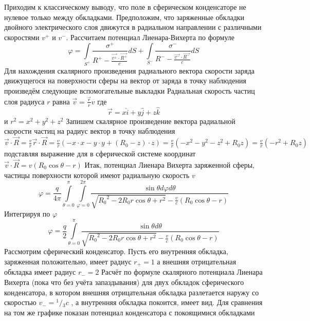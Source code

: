﻿\documentclass{article}
\begin{document}
Приходим к классическому выводу, что поле в сферическом конденсаторе не нулевое только между обкладками.
Предположим, что заряженные обкладки двойного электрического слоя движутся в радиальном направлении с различными скоростями ${{v}^{+}}$ и ${{v}^{-}}$. 
Рассчитаем потенциал Лиенара-Вихерта по формуле
	\[\varphi =\int\limits_{{{S}^{+}}}{\frac{{{\sigma }^{+}}}{{{R}^{+}}-\frac{\overrightarrow{{{v}^{+}}}\cdot \overrightarrow{{{R}^{+}}}}{c}}dS+}\int\limits_{{{S}^{-}}}{\frac{{{\sigma }^{-}}}{{{R}^{-}}-\frac{\overrightarrow{{{v}^{-}}}\cdot \overrightarrow{{{R}^{-}}}}{c}}dS}\] 	
Для нахождения скалярного произведения радиального вектора скорости заряда движущегося на поверхности сферы на вектор от заряда в точку наблюдения произведём следующие вспомогательные выкладки
Радиальная скорость частиц слоя радиуса $r$ равна $\overrightarrow{v}=\frac{\overrightarrow{r}}{r}v$ где \[\overrightarrow{r}=x\widehat{i}+y\widehat{j}+z\widehat{k}\] и ${{r}^{2}}={{x}^{2}}+{{y}^{2}}+{{z}^{2}}$ 
Запишем скалярное произведение вектора радиальной скорости частиц на радиус вектор в точку наблюдения
$\overrightarrow{v}\cdot \overrightarrow{R}=\frac{v}{r}\overrightarrow{r}\cdot \overrightarrow{R}=\frac{v}{r}\left( -x\cdot x-y\cdot y+\left( {{R}_{0}}-z \right)\cdot z \right)=\frac{v}{r}\left( -{{x}^{2}}-{{y}^{2}}-{{z}^{2}}+{{R}_{0}}z \right)=\frac{v}{r}\left( -{{r}^{2}}+{{R}_{0}}z \right)$ 
подставляя выражение для в сферической системе координат
	$\overrightarrow{v}\cdot \overrightarrow{R}=v\left( {{R}_{0}}\cos \theta -r \right)$ 	
Итак, потенциал Лиенара Вихерта заряженной сферы, частицы поверхности которой имеют радиальную скорость $v$ 
	\[\varphi =\frac{q}{4\pi }\int\limits_{\theta =0}^{\pi }{\int\limits_{\varphi =0}^{2\pi }{\frac{\sin \theta d\varphi d\theta }{\sqrt{{{R}_{0}}^{2}-2{{R}_{0}}r\cos \theta +{{r}^{2}}}-\frac{v}{c}\left( {{R}_{0}}\cos \theta -r \right)}}}\] 	
Интегрируя по $\varphi $ 
	\[\varphi =\frac{q}{2}\int\limits_{\theta =0}^{\pi }{\frac{\sin \theta d\theta }{\sqrt{{{R}_{0}}^{2}-2{{R}_{0}}r\cos \theta +{{r}^{2}}}-\frac{v}{c}\left( {{R}_{0}}\cos \theta -r \right)}}\] 	
Рассмотрим сферический конденсатор. Пусть его внутренняя обкладка, заряженная положительно, имеет радиус ${{r}_{+}}=1$ а внешняя отрицательная обкладка имеет радиус ${{r}_{-}}=2$ 
Расчёт по формуле  скалярного потенциала Лиенара Вихерта (пока что без учёта запаздывания) для двух обкладок сферического конденсатора, в котором внешняя отрицательная обкладка разлетается наружу со скоростью ${{v}_{-}}={}^{1}/{}_{3}c$ , а внутренняя обкладка покоится, имеет вид. Для сравнения на том же графике показан потенциал конденсатора с покоящимися обкладками
\end{document}
